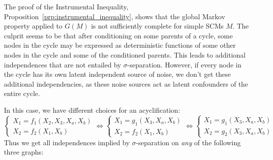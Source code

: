   \begin{Rem}
  The proof of the Instrumental Inequality, Proposition~\ref{prp:instrumental_inequality}, shows that the global Markov property applied to $G(M)$ is not sufficiently complete for simple SCMs $M$.
  The culprit seems to be that after conditioning on some parents of a cycle, some nodes in the cycle may be expressed as deterministic functions of some other nodes in the cycle and some of the conditioned parents.
  This leads to additional independences that are not entailed by $\sigma$-separation.
  However, if every node in the cycle has its own latent independent source of noise, we don't get these additional independencies, as these noise sources act as latent confounders of the entire cycle.

  In this case, we have different choices for an acyclification:
  $$\begin{cases}
    X_1 = f_1(X_2,X_3,X_a,X_b) \\
    X_2 = f_2(X_1,X_b)
  \end{cases} \iff
  \begin{cases}
    X_1 = g_1(X_3,X_a,X_b) \\
    X_2 = f_2(X_1,X_b)
  \end{cases} \iff
  \begin{cases}
    X_1 = g_1(X_3,X_a,X_b) \\
    X_2 = g_2(X_3,X_a,X_b)
  \end{cases}$$
  Thus we get all independences implied by $\sigma$-separation on \emph{any} of the following three graphs:
  \begin{center}
\end{center}
\end{Rem}
